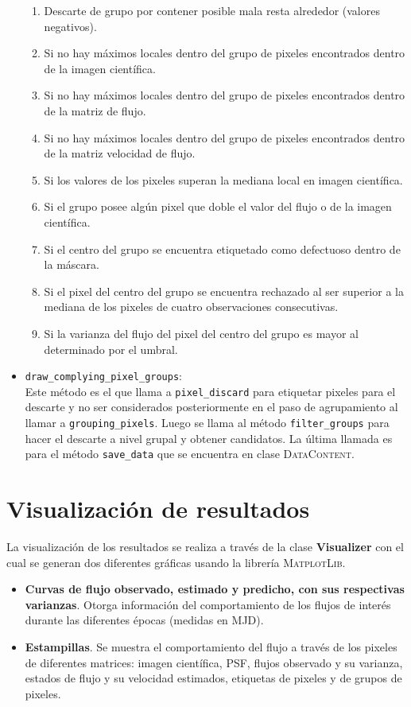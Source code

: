 \begin{itemize}
\begin{enumerate}
\item Descarte de grupo por contener posible mala resta alrededor (valores negativos).  
\item	Si no hay m\'aximos locales dentro del grupo de pixeles encontrados dentro de la imagen cient\'ifica.
\item	Si no hay m\'aximos locales dentro del grupo de pixeles encontrados dentro de la matriz de flujo.
\item	Si no hay m\'aximos locales dentro del grupo de pixeles encontrados dentro de la matriz velocidad de flujo.
\item 	Si los valores de los pixeles superan la mediana local en imagen cient\'ifica.
\item	Si el grupo posee alg\'un pixel que doble el valor del flujo o de la imagen cient\'ifica.
\item	Si el centro del grupo se encuentra etiquetado como defectuoso dentro de la m\'ascara.
\item	Si el pixel del centro del grupo se encuentra rechazado al ser superior a la mediana de los pixeles de cuatro observaciones consecutivas.
\item	Si la varianza del flujo del pixel del centro del grupo es mayor al determinado por el umbral.
\end{enumerate} 
\item \texttt{draw\_complying\_pixel\_groups}:\\
Este m\'etodo es el que llama a \texttt{pixel\_discard} para etiquetar pixeles para el descarte y no ser considerados posteriormente en el paso de agrupamiento al llamar a \texttt{grouping\_pixels}. Luego se llama al m\'etodo \texttt{filter\_groups} para hacer el descarte a nivel grupal y obtener candidatos. La \'ultima llamada es para el m\'etodo \texttt{save\_data} que se encuentra en clase \textsc{DataContent}. 
\end{itemize}

\section{Visualizaci\'on de resultados}
La visualizaci\'on de los resultados se realiza a trav\'es de la clase \textbf{Visualizer} con el cual se generan dos diferentes gr\'aficas usando la librer\'ia \textsc{MatplotLib}. 
\begin{itemize}
\item \textbf{Curvas de flujo observado, estimado y predicho, con sus respectivas varianzas}. Otorga informaci\'on del comportamiento de los flujos de inter\'es durante las diferentes \'epocas (medidas en MJD). 
\item \textbf{Estampillas}. Se muestra el comportamiento del flujo a trav\'es de los pixeles de diferentes matrices: imagen cient\'ifica, PSF, flujos observado y su varianza, estados de flujo y su velocidad estimados, etiquetas de pixeles y de grupos de pixeles.
\end{itemize}

